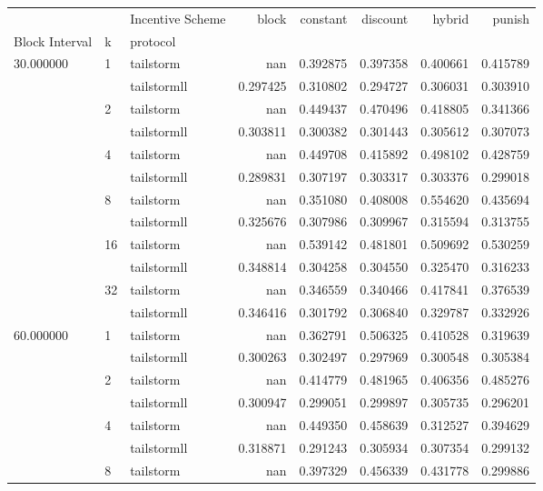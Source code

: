 \begin{tabular}{lllrrrrr}
 &  & Incentive Scheme & block & constant & discount & hybrid & punish \\
Block Interval & k & protocol &  &  &  &  &  \\
\multirow[c]{12}{*}{30.000000} & \multirow[c]{2}{*}{1} & tailstorm & nan & 0.392875 & 0.397358 & 0.400661 & 0.415789 \\
 &  & tailstormll & 0.297425 & 0.310802 & 0.294727 & 0.306031 & 0.303910 \\
 & \multirow[c]{2}{*}{2} & tailstorm & nan & 0.449437 & 0.470496 & 0.418805 & 0.341366 \\
 &  & tailstormll & 0.303811 & 0.300382 & 0.301443 & 0.305612 & 0.307073 \\
 & \multirow[c]{2}{*}{4} & tailstorm & nan & 0.449708 & 0.415892 & 0.498102 & 0.428759 \\
 &  & tailstormll & 0.289831 & 0.307197 & 0.303317 & 0.303376 & 0.299018 \\
 & \multirow[c]{2}{*}{8} & tailstorm & nan & 0.351080 & 0.408008 & 0.554620 & 0.435694 \\
 &  & tailstormll & 0.325676 & 0.307986 & 0.309967 & 0.315594 & 0.313755 \\
 & \multirow[c]{2}{*}{16} & tailstorm & nan & 0.539142 & 0.481801 & 0.509692 & 0.530259 \\
 &  & tailstormll & 0.348814 & 0.304258 & 0.304550 & 0.325470 & 0.316233 \\
 & \multirow[c]{2}{*}{32} & tailstorm & nan & 0.346559 & 0.340466 & 0.417841 & 0.376539 \\
 &  & tailstormll & 0.346416 & 0.301792 & 0.306840 & 0.329787 & 0.332926 \\
\multirow[c]{12}{*}{60.000000} & \multirow[c]{2}{*}{1} & tailstorm & nan & 0.362791 & 0.506325 & 0.410528 & 0.319639 \\
 &  & tailstormll & 0.300263 & 0.302497 & 0.297969 & 0.300548 & 0.305384 \\
 & \multirow[c]{2}{*}{2} & tailstorm & nan & 0.414779 & 0.481965 & 0.406356 & 0.485276 \\
 &  & tailstormll & 0.300947 & 0.299051 & 0.299897 & 0.305735 & 0.296201 \\
 & \multirow[c]{2}{*}{4} & tailstorm & nan & 0.449350 & 0.458639 & 0.312527 & 0.394629 \\
 &  & tailstormll & 0.318871 & 0.291243 & 0.305934 & 0.307354 & 0.299132 \\
 & \multirow[c]{2}{*}{8} & tailstorm & nan & 0.397329 & 0.456339 & 0.431778 & 0.299886 \\

\end{tabular}
